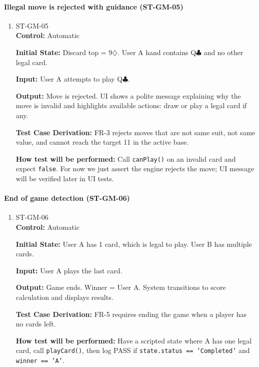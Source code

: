 \documentclass[12pt, titlepage]{article}
\begin{document}
\paragraph{Illegal move is rejected with guidance (ST-GM-05)}
\begin{enumerate}
\item{ST-GM-05\\}
\textbf{Control:} Automatic

\textbf{Initial State:} Discard top = 9$\diamondsuit$. User A hand contains Q$\clubsuit$ and no other legal card.

\textbf{Input:} User A attempts to play Q$\clubsuit$.

\textbf{Output:} Move is rejected. UI shows a polite message explaining why the move is invalid and highlights available actions: draw or play a legal card if any.

\textbf{Test Case Derivation:} FR-3 rejects moves that are not same suit, not same value, and cannot reach the target 11 in the active base.

\textbf{How test will be performed:} Call \texttt{canPlay()} on an invalid card and expect \texttt{false}. For now we just assert the engine rejects the move; UI message will be verified later in UI tests.
\end{enumerate}

\paragraph{End of game detection (ST-GM-06)}
\begin{enumerate}
\item{ST-GM-06\\}
\textbf{Control:} Automatic

\textbf{Initial State:} User A has 1 card, which is legal to play. User B has multiple cards.

\textbf{Input:} User A plays the last card.

\textbf{Output:} Game ends. Winner = User A. System transitions to score calculation and displays results.

\textbf{Test Case Derivation:} FR-5 requires ending the game when a player has no cards left.

\textbf{How test will be performed:} Have a scripted state where A has one legal card, call \texttt{playCard()}, then log PASS if \texttt{state.status == 'Completed'} and \texttt{winner == 'A'}.
\end{enumerate}
\end{document}
